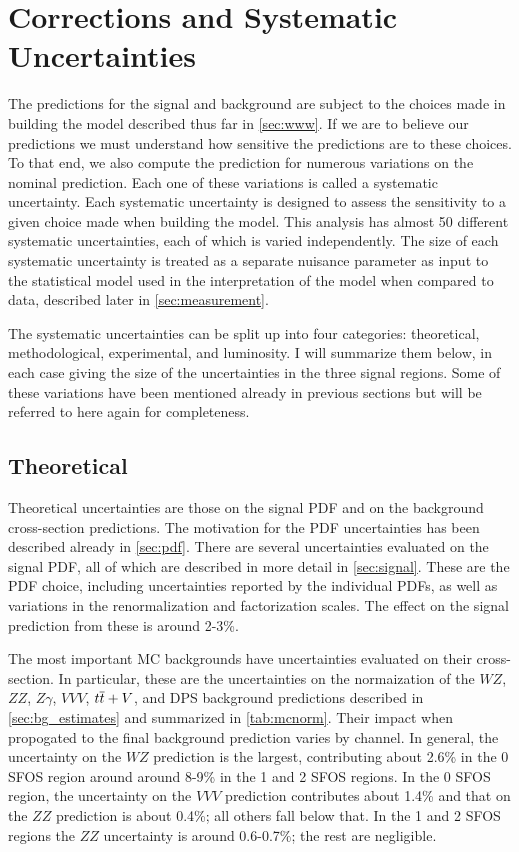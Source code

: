 \section{Corrections and Systematic Uncertainties}
\label{sec:systematics}

The predictions for the signal and background are subject
to the choices made in building the model described thus
far in \sec\ref{sec:www}. If we are to believe our predictions
we must understand how sensitive the predictions are to these choices.
To that end, we also compute the prediction for numerous variations
on the nominal prediction. 
Each one of these variations is called a systematic uncertainty. 
Each systematic uncertainty is designed to assess the sensitivity
to a given choice made when building the model. 
This analysis has almost 50 different systematic
uncertainties, each of which is varied independently. The size of 
each systematic uncertainty
is treated as a separate nuisance parameter
as input to the statistical model used in the interpretation of the model
when compared to data, described later in \sec\ref{sec:measurement}.

The systematic uncertainties can be split up into four categories:
theoretical, methodological, experimental, and luminosity. 
I will summarize them below, in each case giving the 
size of the uncertainties in the three signal regions. 
Some of these variations have 
been mentioned already in previous sections but will be
referred to here again for completeness.

\subsection{Theoretical}
Theoretical uncertainties are those on the signal PDF and 
on the background cross-section predictions.
The motivation for the PDF uncertainties has been described
already in \sec\ref{sec:pdf}. 
There are several uncertainties evaluated on the signal PDF, all of which
are described in more detail in \sec\ref{sec:signal}. These
are the PDF choice, including uncertainties reported by the individual
PDFs, as well as variations in the renormalization and factorization scales.
The effect on the signal prediction from these is around 2-3\%.


The most important MC backgrounds have uncertainties evaluated on their
cross-section.  In particular, these are the uncertainties on the 
normaization of the $WZ$, $ZZ$, $Z\gamma$, $VVV$, $t\overline{t}+V$, 
and DPS background predictions
described in \sec\ref{sec:bg_estimates} and summarized in \tab\ref{tab:mcnorm}.
Their impact when propogated to the final background prediction
varies by channel. In general, the uncertainty on the $WZ$ prediction is the 
largest, contributing about 2.6\% in the 0 SFOS region around around 8-9\%
in the 1 and 2 SFOS regions.  In the 0 SFOS region, the uncertainty 
on the $VVV$ prediction contributes about 1.4\% and that on the $ZZ$ prediction
is about 0.4\%; all others fall below that. 
In the 1 and 2 SFOS regions the $ZZ$ uncertainty is around 0.6-0.7\%; the
rest are negligible. 


